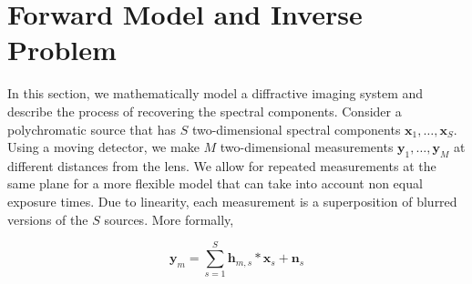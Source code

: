 \documentclass{article}
\begin{document}


\section{Forward Model and Inverse Problem}
\label{sec:format}
In this section, we mathematically model a diffractive imaging
system and describe the process of recovering the spectral components. Consider
a polychromatic source that has $S$ two-dimensional spectral components
$\bm{x}_1, \dots, \bm{x}_S$. Using a moving detector, we make $M$
two-dimensional measurements $\bm{y}_1, \dots, \bm{y}_M$ at different distances
from the lens. We allow for repeated measurements at the same plane for a more
flexible model that can take into account non equal exposure times. %
Due to linearity, each measurement is a superposition of blurred
versions of the $S$ sources. More formally,

\begin{equation}
\bm{y}_m = \sum_{s=1}^S \bm{h}_{m,s} \ast \bm{x}_s + \bm{n}_s
\label{eq:fwd_model}
\end{equation}
\end{document}
